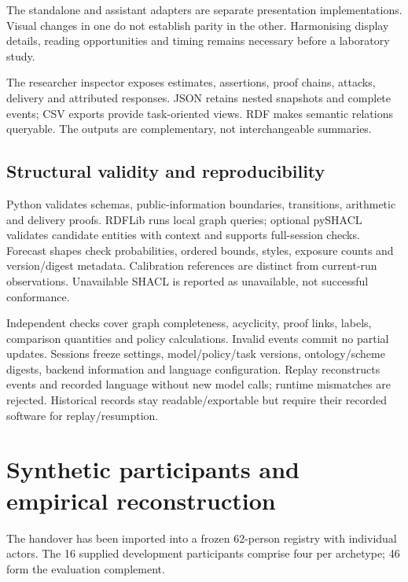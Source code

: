 \documentclass[11pt,a4paper]{article}
\begin{document}
The standalone  and assistant  adapters are separate presentation implementations. Visual changes in one do not establish parity in the other. Harmonising display details, reading opportunities and timing remains necessary before a laboratory study.

The researcher inspector exposes estimates, assertions, proof chains, attacks, delivery and attributed responses. JSON retains nested snapshots and complete events; CSV exports provide task-oriented views. RDF makes semantic relations queryable. The outputs are complementary, not interchangeable summaries.

\subsection{Structural validity and reproducibility}
Python validates schemas, public-information boundaries, transitions, arithmetic and delivery proofs. RDFLib runs local graph queries; optional pySHACL validates candidate entities with context and supports full-session checks. Forecast shapes check probabilities, ordered bounds, styles, exposure counts and version/digest metadata. Calibration references are distinct from current-run observations. Unavailable SHACL is reported as unavailable, not successful conformance.

Independent checks cover graph completeness, acyclicity, proof links, labels, comparison quantities and policy calculations. Invalid events commit no partial updates. Sessions freeze settings, model/policy/task versions, ontology/scheme digests, backend information and language configuration. Replay reconstructs events and recorded language without new model calls; runtime mismatches are rejected. Historical records stay readable/exportable but require their recorded software for replay/resumption.

\section{Synthetic participants and empirical reconstruction}
The handover has been imported into a frozen 62-person registry with individual actors. The 16 supplied development participants comprise four per archetype; 46 form the evaluation complement.
\end{document}
